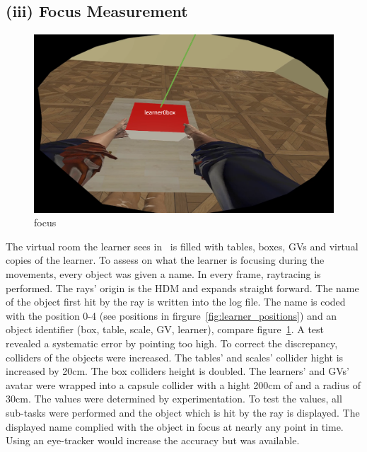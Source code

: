 \subsection{(iii) Focus Measurement}
\label{sec:rayTrace}
\begin{figure}[H]
	\centering
	\includegraphics[width=\textwidth]{figures/focus.png}
	\caption[focus]{focus}
	\label{fig:focusAssessment}
\end{figure}
The virtual room the learner sees in \exgo\ is filled with tables, boxes, GVs and virtual copies of the learner. To assess on what the learner is focusing during the movements, every object was given a name. In every frame, raytracing is performed. The rays' origin is the HDM and expands straight forward. The name of the object first hit by the ray is written into the log file. The name is coded with the position 0-4 (see positions in firgure~\ref{fig:learner_positions}) and an object identifier (box, table, scale, GV, learner), compare figure~\ref{fig:focusAssessment}. A test revealed a systematic error by pointing too high. To correct the discrepancy, colliders of the objects were increased. The tables' and scales' collider hight is increased by 20cm. The box colliders height is doubled. The learners' and GVs' avatar were wrapped into a capsule collider with a hight 200cm of and a radius of 30cm. The values were determined by experimentation. To test the values, all sub-tasks were performed and the object which is hit by the ray is displayed. The displayed name complied with the object in focus at nearly any point in time. Using an eye-tracker would increase the accuracy but was available.


